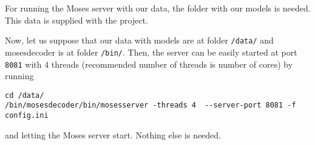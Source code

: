 For running the Moses server with our data, the folder with our models is needed. This data is supplied with the project.

Now, let us suppose that our data with models are at folder \texttt{/data/} and mosesdecoder is at folder \texttt{/bin/}. Then, the server can be easily started at port \texttt{8081} with 4 threads (recommended number of threads is number of cores) by running

\begin{lstlisting}
cd /data/
/bin/mosesdecoder/bin/mosesserver -threads 4  --server-port 8081 -f config.ini 
\end{lstlisting}

and letting the Moses server start. Nothing else is needed.
